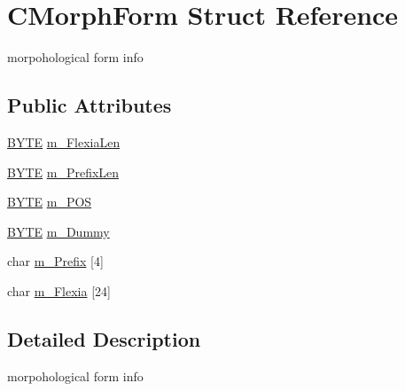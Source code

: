 \hypertarget{structCMorphForm}{\section{C\-Morph\-Form Struct Reference}
\label{structCMorphForm}
}


morpohological form info  


\subsection*{Public Attributes}
\begin{DoxyCompactItemize}
\item 
\hyperlink{sphinxstd_8h_a4ae1dab0fb4b072a66584546209e7d58}{B\-Y\-T\-E} \hyperlink{structCMorphForm_afe03dab48f9c9132cade2f9a02ed851b}{m\-\_\-\-Flexia\-Len}
\item 
\hyperlink{sphinxstd_8h_a4ae1dab0fb4b072a66584546209e7d58}{B\-Y\-T\-E} \hyperlink{structCMorphForm_ae19b5cf577a953dd80b68071e4164dfb}{m\-\_\-\-Prefix\-Len}
\item 
\hyperlink{sphinxstd_8h_a4ae1dab0fb4b072a66584546209e7d58}{B\-Y\-T\-E} \hyperlink{structCMorphForm_a88a8227da72a4f9e3fa09f83365d3f77}{m\-\_\-\-P\-O\-S}
\item 
\hyperlink{sphinxstd_8h_a4ae1dab0fb4b072a66584546209e7d58}{B\-Y\-T\-E} \hyperlink{structCMorphForm_a6592ec7427eeb8a570ae045b8b9d89d5}{m\-\_\-\-Dummy}
\item 
char \hyperlink{structCMorphForm_a4872d8bb505a8c4370606e8d17ea6a81}{m\-\_\-\-Prefix} \mbox{[}4\mbox{]}
\item 
char \hyperlink{structCMorphForm_ada33aea12ec0107484136cc4ce1903b9}{m\-\_\-\-Flexia} \mbox{[}24\mbox{]}
\end{DoxyCompactItemize}


\subsection{Detailed Description}
morpohological form info 

